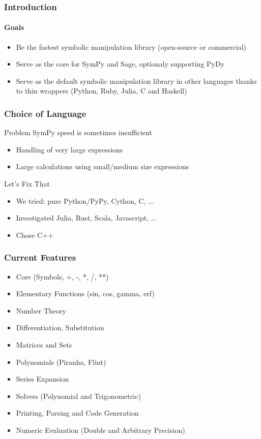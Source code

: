 \documentclass{beamer}
\begin{document}
\begin{frame}
\frametitle{Introduction}
\framesubtitle{Goals}
\begin{itemize}
\item Be the fastest symbolic manipulation library (open-source or commercial)
\item Serve as the core for SymPy and Sage, optionaly supporting PyDy
\item Serve as the default symbolic manipulation library in other languages
    thanks to thin wrappers (Python, Ruby, Julia, C and Haskell)
\end{itemize}
\end{frame}


\begin{frame}
\frametitle{Choice of Language}
\begin{block}{Problem}
SymPy speed is sometimes insufficient
\begin{itemize}
\item Handling of very large expressions
\item Large calculations using small/medium size expressions
\end{itemize}
\end{block}

\begin{block}{Let's Fix That}
\begin{itemize}
\item We tried: pure Python/PyPy, Cython, C, ...
\item Investigated Julia, Rust, Scala, Javascript, ...
\item Chose C++
\end{itemize}
\end{block}
\end{frame}




\begin{frame}
\frametitle{Current Features}
\begin{itemize}
    \item Core (Symbols, +, -, *, /, **)
    \item Elementary Functions (sin, cos, gamma, erf)
    \item Number Theory
    \item Differentiation, Substitution
    \item Matrices and Sets
    \item Polynomials (Piranha, Flint)
    \item Series Expansion
    \item Solvers (Polynomial and Trigonometric)
    \item Printing, Parsing and Code Generation
    \item Numeric Evaluation (Double and Arbitrary Precision)
\end{itemize}
\end{frame}
\end{document}
